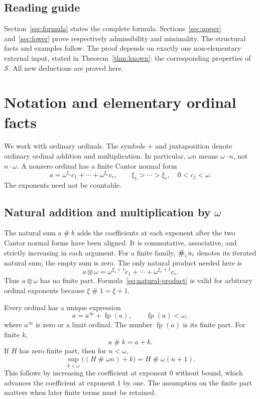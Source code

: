 \documentclass[11pt,letterpaper]{article}
\theoremstyle{definition}
\theoremstyle{remark}
\newcommand{\Sop}{\mathcal S}
\newcommand{\ns}{\mathbin{\#}}
\newcommand{\np}{\mathbin{\otimes}}
\newcommand{\NS}{\mathop{\mathchoice{\vcenter{\hbox{\Large\#}}}{\vcenter{\hbox{\large\#}}}{\#}{\#}}}
\newcommand{\fp}{\operatorname{fp}}
\begin{document}
\subsection{Reading guide}

Section~\ref{sec:formula} states the complete formula. Sections~\ref{sec:upper} and~\ref{sec:lower} prove respectively admissibility and minimality. The structural facts and examples follow. The proof depends on exactly one non-elementary external input, stated in Theorem~\ref{thm:known}: the corresponding properties of $\Sop$. All new deductions are proved here.

\section{Notation and elementary ordinal facts}\label{sec:prelim}

We work with ordinary ordinals. The symbols $+$ and juxtaposition denote ordinary ordinal addition and multiplication. In particular, $\omega n$ means $\omega\cdot n$, not $n\cdot\omega$. A nonzero ordinal has a finite Cantor normal form
\[
 a=\omega^{\xi_1}c_1+\cdots+\omega^{\xi_r}c_r,
 \qquad \xi_1>\cdots>\xi_r,\quad 0<c_j<\omega.
\]
The exponents need not be countable.

\subsection{Natural addition and multiplication by \texorpdfstring{$\omega$}{omega}}

The natural sum $a\ns b$ adds the coefficients at each exponent after the two Cantor normal forms have been aligned. It is commutative, associative, and strictly increasing in each argument. For a finite family, $\NS_i a_i$ denotes its iterated natural sum; the empty sum is zero. The only natural product needed here is
\begin{equation}\label{eq:natural-product}
 a\np\omega=\omega^{\xi_1+1}c_1+\cdots+\omega^{\xi_r+1}c_r.
\end{equation}
Thus $a\np\omega$ has no finite part. Formula~\eqref{eq:natural-product} is valid for arbitrary ordinal exponents because $\xi\ns1=\xi+1$.

Every ordinal has a unique expression
\[
 a=a^{\infty}+\fp(a),\qquad \fp(a)<\omega,
\]
where $a^{\infty}$ is zero or a limit ordinal. The number $\fp(a)$ is its finite part. For finite $k$,
\begin{equation}\label{eq:finite-add}
 a\ns k=a+k.
\end{equation}
If $H$ has zero finite part, then for $n<\omega$,
\begin{equation}\label{eq:omega-sup}
 \sup_{k<\omega}\bigl((H\ns\omega n)+k\bigr)
   =H\ns\omega(n+1).
\end{equation}
This follows by increasing the coefficient at exponent $0$ without bound, which advances the coefficient at exponent $1$ by one. The assumption on the finite part matters when later finite terms must be retained.
\end{document}
